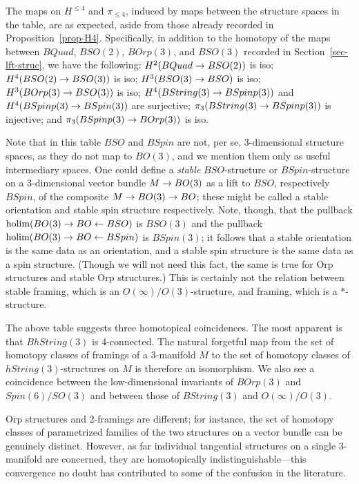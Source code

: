 \documentclass{amsart}
\begin{document}
The maps on $H^{\leq 4}$ and $\pi_{\leq 4}$, induced by maps between the structure spaces in the table, are as expected, aside from those already recorded in Proposition~\ref{prop-H4}.  Specifically, in addition to the homotopy of the maps between $BQuad$, $BSO(2)$, $BOrp(3)$, and $BSO(3)$ recorded in Section~\ref{sec-lft-struc}, we have the following: $H^2(BQuad \rightarrow BSO(2))$ is iso; $H^4(BSO(2) \rightarrow BSO(3))$ is iso; $H^3(BSO(3) \rightarrow BSO)$ is iso; $H^3(BOrp(3) \rightarrow BSO(3))$ is iso; $H^4(BString(3) \rightarrow BSpinp(3))$ and $H^4(BSpinp(3) \rightarrow BSpin(3))$ are surjective; $\pi_3(BString(3) \rightarrow BSpinp(3))$ is injective; and $\pi_3(BSpinp(3) \rightarrow BOrp(3))$ is iso. %

Note that in this table $BSO$ and $BSpin$ are not, per se, 3-dimensional structure spaces, as they do not map to $BO(3)$, and we mention them only as useful intermediary spaces.  One could define a \emph{stable} $BSO$-structure or $BSpin$-structure on a 3-dimensional vector bundle $M \rightarrow BO(3)$ as a lift to $BSO$, respectively $BSpin$, of the composite $M \rightarrow BO(3) \rightarrow BO$; these might be called a stable orientation and stable spin structure respectively.  Note, though, that the pullback $\operatorname{holim}(BO(3) \rightarrow BO \leftarrow BSO)$ is $BSO(3)$ and the pullback $\operatorname{holim}(BO(3) \rightarrow BO \leftarrow BSpin)$ is $BSpin(3)$; it follows that a stable orientation is the same data as an orientation, and a stable spin structure is the same data as a spin structure.  (Though we will not need this fact, the same is true for Orp structures and stable Orp structures.)  This is certainly not the relation between stable framing, which is an $O(\infty)/O(3)$-structure, and framing, which is a $*$-structure.

The above table suggests three homotopical coincidences.  The most apparent is that $BhString(3)$ is 4-connected.  The natural forgetful map from the set of homotopy classes of framings of a 3-manifold $M$ to the set of homotopy classes of $hString(3)$-structures on $M$ is therefore an isomorphism.  We also see a coincidence between the low-dimensional invariants of $BOrp(3)$ and $Spin(6)/SO(3)$ and between those of $BString(3)$ and $O(\infty)/O(3)$.

Orp structures and 2-framings are different; for instance, the set of homotopy classes of parametrized families of the two structures on a vector bundle can be genuinely distinct.  However, as far individual tangential structures on a single 3-manifold are concerned, they are homotopically indistinguishable---this convergence no doubt has contributed to some of the confusion in the literature.
\end{document}
